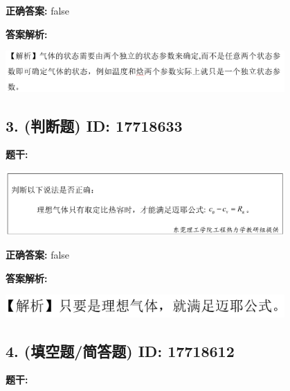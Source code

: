 \documentclass[12pt]{article}
\begin{document}
\textbf{正确答案:}
false

\textbf{答案解析:}


\begin{center}\includegraphics[width=0.8\textwidth, height=0.25\textheight, keepaspectratio]{question_2_17718632/correct_replay_img_1.png}\end{center}

\vspace{0.5em}\hrulefill\vspace{1em}

\subsection*{3. (判断题) \small ID: 17718633}

\textbf{题干:}


\begin{center}\includegraphics[width=0.8\textwidth, height=0.25\textheight, keepaspectratio]{question_3_17718633/title_img_1.png}\end{center}

\textbf{正确答案:}
false

\textbf{答案解析:}


\begin{center}\includegraphics[width=0.8\textwidth, height=0.25\textheight, keepaspectratio]{question_3_17718633/correct_replay_img_1.png}\end{center}

\vspace{0.5em}\hrulefill\vspace{1em}

\subsection*{4. (填空题/简答题) \small ID: 17718612}

\textbf{题干:}
\end{document}
